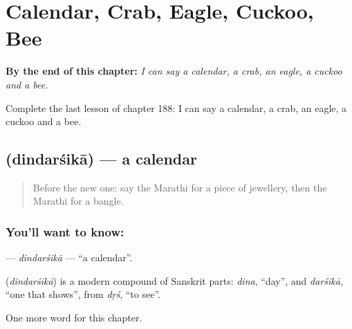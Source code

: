 
\chapter{Calendar, Crab, Eagle, Cuckoo, Bee}
\label{ch:mr-calendar-crab-eagle-cuckoo-bee}

\begin{chapteropening}
\textbf{By the end of this chapter:} \emph{I can say a calendar, a crab, an eagle, a cuckoo and a bee.}

Complete the last lesson of chapter 188: I can say a calendar, a crab, an eagle, a cuckoo and a bee.
\end{chapteropening}

\section[\texorpdfstring{\mr{दिनदर्शिका} (dindarśikā)}{दिनदर्शिका (dindarśikā)}]{ (dindarśikā) — a calendar}

\label{lesson:MR-C188-dindarsika}



\begin{quote}
Before the new one: say the Marathi for a piece of jewellery, then the Marathi for a bangle.
\end{quote}

\subsection*{You'll want to know: }
\textbf{} — \emph{dindarśikā} — \textquotedblleft{}a calendar\textquotedblright{}.

\begin{cousinweb}
\textbf{} (\emph{dindarśikā}) is a modern compound of Sanskrit parts: \emph{dina}, \textquotedblleft{}day\textquotedblright{}, and \emph{darśikā}, \textquotedblleft{}one that shows\textquotedblright{}, from \emph{dṛś}, \textquotedblleft{}to see\textquotedblright{}.
\end{cousinweb}

\begin{grammarlens}[title={What you've built}]
One more word for this chapter.
\end{grammarlens}

